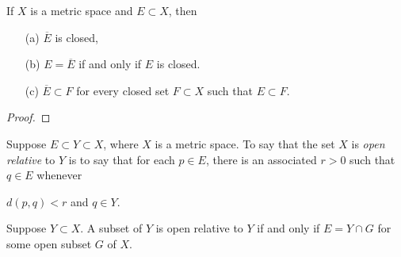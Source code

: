 \documentclass[11pt,a4paper]{book}
\begin{document}
\begin{theorem}[ ]
   If \( X  \) is a metric space and \( E \subset X  \), then 
   \begin{enumerate}
       \item[(a)] \( \overline{E} \) is closed,
        \item[(b)] \( E = \overline{E} \) if and only if \( E  \) is closed.
        \item[(c)] \( \overline{E} \subset F  \) for every closed set \( F \subset X  \) such that \( E \subset F  \).
   \end{enumerate}
\end{theorem}
\begin{proof}

\end{proof}

\begin{definition}
    Suppose \( E \subset Y \subset X  \), where \( X  \) is a metric space. To say that the set \( X  \) is \textit{open relative} to \( Y  \) is to say that for each \( p \in E  \), there is an associated \( r > 0  \) such that \( q \in E  \) whenever
    \begin{center}
        \( d(p,q) < r  \) and \( q \in Y  \).
    \end{center}
\end{definition}

\begin{theorem}[ ]
    Suppose \( Y \subset X  \). A subset of \( Y  \) is open relative to \( Y  \) if and only if \( E = Y \cap G  \) for some open subset \( G  \) of \( X  \).
\end{theorem}
\end{document}
